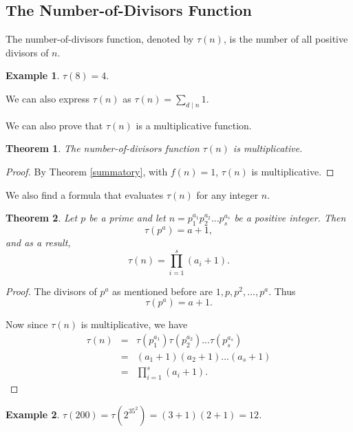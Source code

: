 \documentclass[12pt,letterpaper]{book}
\newtheorem{theorem}{Theorem}
\newtheorem{example}{Example}
\begin{document}
\subsection{\textbf{The Number-of-Divisors Function}}
The number-of-divisors function, denoted by $\tau(n)$, is the number of
all positive divisors of $n$. 
\begin{example}
$\tau(8)=4.$
\end{example}

We can also express $\tau(n)$ as $\tau(n)=\sum_{d\mid n}1$.
\par We can also prove that $\tau(n)$ is a multiplicative function.

\begin{theorem}
The number-of-divisors function $\tau(n)$ is multiplicative.
\end{theorem}

\begin{proof}
By Theorem \ref{summatory}, with $f(n)=1$, $\tau(n)$ is multiplicative.
\end{proof}

We also find a formula that evaluates $\tau(n)$ for any integer $n$.

\begin{theorem}
Let $p$ be a prime and let $n=p_1^{a_1}p_2^{a_2}...p_s^{a_s}$ be a
positive integer. Then
\begin{equation*}
\tau(p^a)=a+1,
\end{equation*}
and as a result,
\begin{equation*}
\tau(n)=\prod_{i=1}^{s}(a_i+1).
\end{equation*}
\end{theorem}

\begin{proof}
The divisors of $p^{a}$ as mentioned before are $1,p,p^2,...,p^a$.
Thus
\begin{equation*}
\tau(p^a)=a+1.
\end{equation*}
\par Now since $\tau(n)$ is multiplicative, we have
\begin{eqnarray*}
\tau(n)&=&\tau(p_1^{a_1})\tau(p_2^{a_2})...\tau(p_s^{a_s})\\&=&
(a_1+1)(a_2+1)...(a_s+1)\\
&=&\prod_{i=1}^{s}(a_i+1).
\end{eqnarray*}
\end{proof}

\begin{example}
$\tau(200)=\tau(2^35^2)=(3+1)(2+1)=12$.
\end{example}
\end{document}
